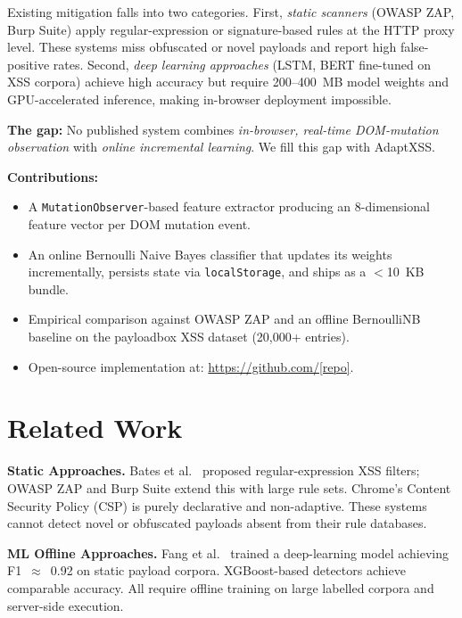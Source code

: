 \documentclass[conference]{IEEEtran}
\begin{document}
Existing mitigation falls into two categories. First, \textit{static scanners} (OWASP ZAP, Burp Suite) apply regular-expression or signature-based rules at the HTTP proxy level. These systems miss obfuscated or novel payloads and report high false-positive rates. Second, \textit{deep learning approaches} \cite{fang2019} (LSTM, BERT fine-tuned on XSS corpora) achieve high accuracy but require 200–400~MB model weights and GPU-accelerated inference, making in-browser deployment impossible.

\textbf{The gap:} No published system combines \textit{in-browser, real-time DOM-mutation observation} with \textit{online incremental learning}. We fill this gap with AdaptXSS.

\textbf{Contributions:}
\begin{itemize}
  \item A \texttt{MutationObserver}-based feature extractor producing an 8-dimensional feature vector per DOM mutation event.
  \item An online Bernoulli Naive Bayes classifier that updates its weights incrementally, persists state via \texttt{localStorage}, and ships as a $<$10~KB bundle.
  \item Empirical comparison against OWASP ZAP and an offline BernoulliNB baseline on the payloadbox XSS dataset (20,000+ entries).
  \item Open-source implementation at: \url{https://github.com/[repo]}.
\end{itemize}

\section{Related Work}

\textbf{Static Approaches.} Bates et al.\ \cite{bates2010} proposed regular-expression XSS filters; OWASP ZAP \cite{owasp_zap} and Burp Suite extend this with large rule sets. Chrome's Content Security Policy (CSP) is purely declarative and non-adaptive. These systems cannot detect novel or obfuscated payloads absent from their rule databases.

\textbf{ML Offline Approaches.} Fang et al.\ \cite{fang2019} trained a deep-learning model achieving F1~$\approx$~0.92 on static payload corpora. XGBoost-based detectors \cite{heiderich2012} achieve comparable accuracy. All require offline training on large labelled corpora and server-side execution.
\end{document}
